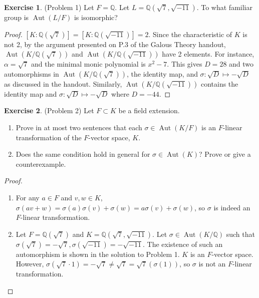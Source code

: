 \documentclass[12pt, psamsfonts]{amsart}
\theoremstyle{definition}
\newtheorem*{exer}{Exercise}
\theoremstyle{remark}
\DeclareMathOperator{\Aut}{Aut}
\numberwithin{equation}{section}
\begin{document}
\begin{exer}{(Problem 1)}
  Let $F = \mathbb{Q}$.
  Let $L = \mathbb{Q}(\sqrt{7}, \sqrt{-11})$.
  To what familiar group is $\Aut(L/F)$ is isomorphic?
\end{exer}

\begin{proof}
  $[K:\mathbb{Q}(\sqrt{7})] = [K:\mathbb{Q}(\sqrt{-11})] = 2$.
  Since the characteristic of $K$ is not 2, by the argument presented on P.3 of the Galous Theory handout, $\Aut(K/\mathbb{Q}(\sqrt{7}))$ and $\Aut(K/\mathbb{Q}(\sqrt{-11}))$ have 2 elements.
  For instance, $\alpha = \sqrt{7}$ and the minimal monic polynomial is $x^2 - 7$.
  This gives $D = 28$ and two automorphisms in $\Aut(K/\mathbb{Q}(\sqrt{7}))$, the identity map, and $\sigma: \sqrt{D} \mapsto -\sqrt{D}$ as discussed in the handout.
  Similarly, $\Aut(K/\mathbb{Q}(\sqrt{-11}))$ contains the identity map and $\sigma: \sqrt{D} \mapsto -\sqrt{D}$ where $D = -44$.
\end{proof}

\begin{exer}{(Problem 2)}
  Let $F \subset K$ be a field extension.
  \begin{enumerate}
    \item
      Prove in at most two sentences that each $\sigma \in \Aut(K / F)$ is an $F$-linear transformation of the $F$-vector space, $K$.
    \item
      Does the same condition hold in general for $\sigma \in \Aut(K)$?
      Prove or give a counterexample.
  \end{enumerate}
\end{exer}

\begin{proof}
  $ $
  \begin{enumerate}
    \item
      For any $a \in F$ and $v, w \in K$, $\sigma(av + w) = \sigma(a)\sigma(v) + \sigma(w) = a\sigma(v) + \sigma(w)$, so $\sigma$ is indeed an $F$-linear transformation.
    \item
      Let $F = \mathbb{Q}(\sqrt{7})$ and $K = \mathbb{Q}(\sqrt{7}, \sqrt{-11})$.
      Let $\sigma \in \Aut(K / \mathbb{Q})$ such that $\sigma(\sqrt{7}) = -\sqrt{7}, \sigma(\sqrt{-11}) = -\sqrt{-11}$.
      The existence of such an automorphism is shown in the solution to Problem 1.
      $K$ is an $F$-vector space.
      However, $\sigma(\sqrt{7} \cdot 1) = -\sqrt{7} \ne \sqrt{7} = \sqrt{7}(\sigma(1))$, so $\sigma$ is not an $F$-linear transformation.
  \end{enumerate}
\end{proof}
\end{document}

